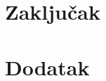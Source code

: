 \documentclass[a4paper]{article}
\newtheorem{primer}{Primer}[section]
\begin{document}



%


\newpage
\section{Zaključak}
\label{sec:zakljucak}

 


\appendix
\section{Dodatak}
\end{document}
